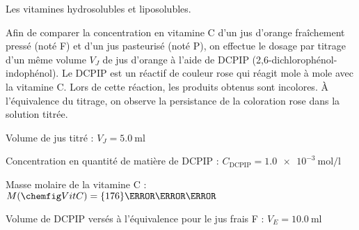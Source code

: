 

Les vitamines hydrosolubles et liposolubles.






Afin de comparer la concentration en vitamine C d’un jus d’orange fraîchement pressé (noté F) et d'un jus pasteurisé (noté P), on effectue le dosage par titrage d'un même volume $V_J$ de jus d’orange à l’aide de DCPIP (2,6-dichlorophénol-indophénol).
Le DCPIP est un réactif de couleur rose qui réagit mole à mole avec la vitamine C.
Lors de cette réaction, les produits obtenus sont incolores.
À l'équivalence du titrage, on observe la persistance de la coloration rose dans la solution titrée.

\pasCorrection{\pagebreak}
\begin{donnees}
  \item Volume de jus titré : $V_J = \qty{5,0}{\ml}$
  \item Concentration en quantité de matière de DCPIP : $C_\text{DCPIP} = \qty{1,0e-3}{\mole\per\l}$
  \item Masse molaire de la vitamine C : $\masseMol{Vit C} = \qty{176}{\g\per\mole}$
  \item Volume de DCPIP versés à l’équivalence pour le jus frais F : $V_E = \qty{10,0}{\ml}$
\end{donnees}

